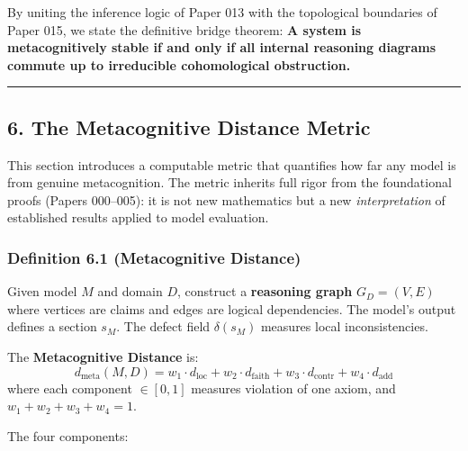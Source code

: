 \documentclass[
]{article}
\begin{document}
By uniting the inference logic of Paper 013 with the topological
boundaries of Paper 015, we state the definitive bridge theorem:
\textbf{A system is metacognitively stable if and only if all internal
reasoning diagrams commute up to irreducible cohomological obstruction.}

\begin{center}\rule{0.5\linewidth}{0.5pt}\end{center}

\subsection{6. The Metacognitive Distance
Metric}\label{the-metacognitive-distance-metric}

This section introduces a computable metric that quantifies how far any
model is from genuine metacognition. The metric inherits full rigor from
the foundational proofs (Papers 000--005): it is not new mathematics but
a new \emph{interpretation} of established results applied to model
evaluation.

\subsubsection{Definition 6.1 (Metacognitive
Distance)}\label{definition-6.1-metacognitive-distance}

Given model \(M\) and domain \(D\), construct a \textbf{reasoning graph}
\(G_D = (V, E)\) where vertices are claims and edges are logical
dependencies. The model's output defines a section \(s_M\). The defect
field \(\delta(s_M)\) measures local inconsistencies.

The \textbf{Metacognitive Distance} is:
\[d_{\mathrm{meta}}(M, D) = w_1 \cdot d_{\mathrm{loc}} + w_2 \cdot d_{\mathrm{faith}} + w_3 \cdot d_{\mathrm{contr}} + w_4 \cdot d_{\mathrm{add}}\]
where each component \(\in [0, 1]\) measures violation of one axiom, and
\(w_1 + w_2 + w_3 + w_4 = 1\).

The four components:
\end{document}
